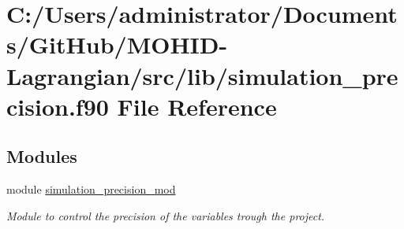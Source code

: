 \hypertarget{simulation__precision_8f90}{}\section{C\+:/\+Users/administrator/\+Documents/\+Git\+Hub/\+M\+O\+H\+I\+D-\/\+Lagrangian/src/lib/simulation\+\_\+precision.f90 File Reference}
\label{simulation__precision_8f90}
\subsection*{Modules}
\begin{DoxyCompactItemize}
\item 
module \mbox{\hyperlink{namespacesimulation__precision__mod}{simulation\+\_\+precision\+\_\+mod}}
\begin{DoxyCompactList}\small\item\em Module to control the precision of the variables trough the project. \end{DoxyCompactList}\end{DoxyCompactItemize}
